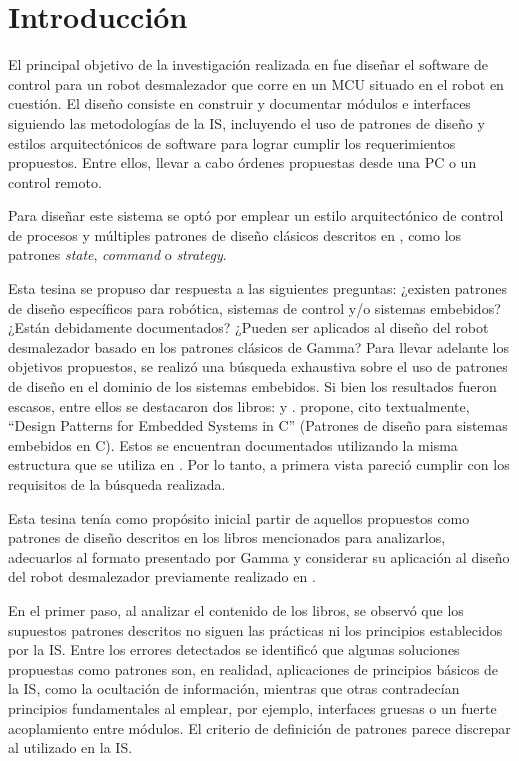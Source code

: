 \chapter{Introducción}

El principal objetivo de la investigación realizada en \cite{paperPomponio} fue diseñar el software de control para un robot desmalezador que corre en un \gls{MCU} situado en el robot en cuestión. El diseño consiste en construir y documentar módulos e interfaces siguiendo las metodologías de la \gls{IS}, incluyendo el uso de patrones de diseño y estilos arquitectónicos de software para lograr cumplir los requerimientos propuestos. Entre ellos, llevar a cabo órdenes propuestas desde una PC o un control remoto.

Para diseñar este sistema se optó por emplear un estilo arquitectónico de control de procesos \cite[pág. 27]{ShawGarlan1996} y múltiples patrones de diseño clásicos descritos en \cite{Gamma:1995:DPE:186897}, como los patrones \textit{state}, \textit{command} o \textit{strategy}.

Esta tesina se propuso dar respuesta a las siguientes preguntas: ¿existen patrones de diseño específicos para robótica, sistemas de control y/o sistemas embebidos? ¿Están debidamente documentados? ¿Pueden ser aplicados al diseño del robot desmalezador basado en los patrones clásicos de Gamma? Para llevar adelante los objetivos propuestos, se realizó una búsqueda exhaustiva sobre el uso de patrones de diseño en el dominio de los sistemas embebidos. Si bien los resultados fueron escasos,  entre ellos se destacaron dos libros: \cite{douglass} y \cite{elecia-embedded}. \cite{douglass} propone, cito textualmente, ``Design Patterns for Embedded Systems in C'' (Patrones de diseño para sistemas embebidos en C). Estos se encuentran documentados utilizando la misma estructura que se utiliza en \cite{Gamma:1995:DPE:186897}. Por lo tanto, a primera vista pareció cumplir con los requisitos de la búsqueda realizada.

Esta tesina tenía como propósito inicial partir de aquellos propuestos como patrones de diseño descritos en los libros mencionados para analizarlos, adecuarlos al formato presentado por Gamma \cite{Gamma:1995:DPE:186897} y considerar su aplicación al diseño del robot desmalezador previamente realizado en \cite{paperPomponio}.

En el primer paso, al analizar el contenido de los libros, se observó que los supuestos patrones descritos no siguen las prácticas ni los principios establecidos por la \gls{IS}. Entre los errores detectados se identificó que algunas soluciones propuestas como patrones son, en realidad, aplicaciones de principios básicos de la \gls{IS}, como la ocultación de información, mientras que otras contradecían principios fundamentales al emplear, por ejemplo, interfaces gruesas o un fuerte acoplamiento entre módulos. El criterio de definición de patrones parece discrepar al utilizado en la \gls{IS}.

